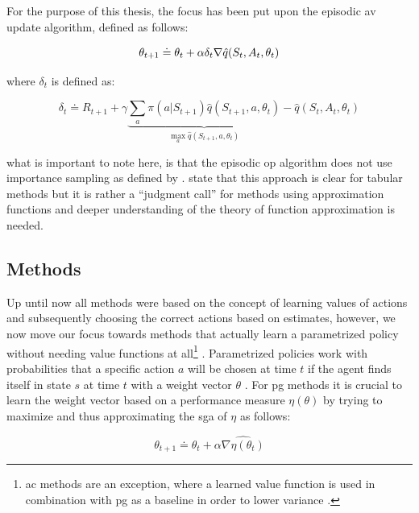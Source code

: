 For the purpose of this thesis, the focus has been put upon the episodic \gls{av} update algorithm, defined as follows:

\begin{equation}
	\theta_{t+1} \doteq \theta_t + \alpha \delta_t \nabla \hat{q} (S_t,A_t,\theta_t)\\
\end{equation}

where $\delta_t$ is defined as:

\begin{equation}
	\delta_t \doteq R_{t+1} + \gamma \underbrace{\sum_a \pi (a|S_{t+1}) \hat{q} (S_{t+1},a,\theta_t)}_{\max_a \hat{q} (S_{t+1},a,\theta_t)} - \hat{q} (S_t,A_t,\theta_t)
\end{equation}

what is important to note here, is that the episodic \gls{op} algorithm does not use importance sampling as defined by  \citep[p. 244]{Sutton2017}. \citet[p. 244]{Sutton2017} state that this approach is clear for tabular methods but it is rather a ``judgment call'' for methods using approximation functions and deeper understanding of the theory of function approximation is needed.

\subsection{ Methods}
\label{subsec:polgrad_methods}

Up until now all methods were based on the concept of learning values of actions and subsequently choosing the correct actions based on estimates, however, we now move our focus towards methods that actually learn a parametrized policy without needing value functions at all\footnote{\gls{ac} methods are an exception, where a learned value function is used in combination with \gls{pg} as a baseline in order to lower variance \citep{Sutton2017}.}  \citep[p. 265]{Sutton2017}. Parametrized policies work with probabilities that a specific action $a$ will be chosen at time $t$ if the agent finds itself in state $s$ at time $t$ with a weight vector $\theta$ \citep[p. 265]{Sutton2017}. For \gls{pg} methods it is crucial to learn the weight vector based on a performance measure $\eta(\theta)$ by trying to maximize and thus approximating the \gls{sga} of $\eta$ as follows:

\begin{equation}
	\theta_{t+1} \doteq \theta_t + \alpha \widehat{\nabla \eta (\theta_t)}
\end{equation}

